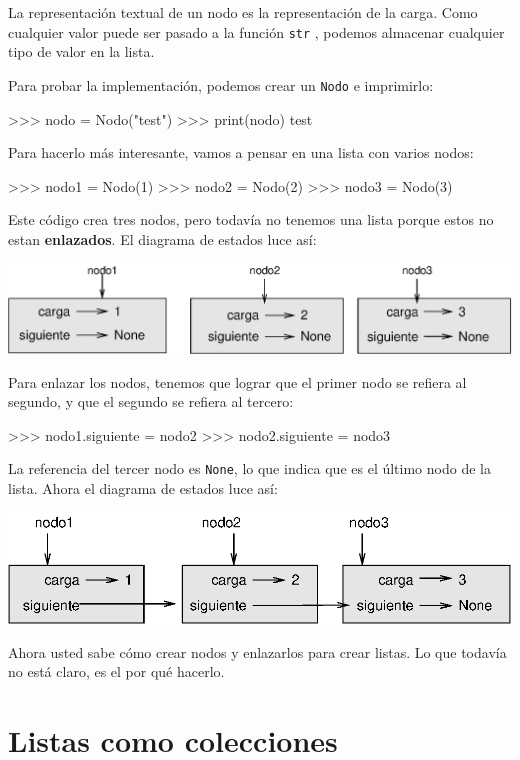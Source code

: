 La representación textual de un nodo es la representación de la carga.
Como cualquier valor puede ser pasado a la función \texttt{str} ,
podemos almacenar cualquier tipo de valor en la lista.

Para probar la implementación, podemos crear un \texttt{Nodo} e imprimirlo:

\beforeverb 
\begin{pyconcode}
>>> nodo = Nodo("test")
>>> print(nodo)
test
\end{pyconcode}
\afterverb Para hacerlo más interesante, vamos a pensar en una lista
con varios nodos:

\beforeverb 
\begin{pyconcode}
>>> nodo1 = Nodo(1)
>>> nodo2 = Nodo(2)
>>> nodo3 = Nodo(3)
\end{pyconcode}
\afterverb Este código crea tres nodos, pero todavía no tenemos una
lista porque estos no estan \textbf{enlazados}. El diagrama de estados
luce así:

\beforefig \centerline{\includegraphics[scale=0.7]{illustrations/link1}}
\afterfig

Para enlazar los nodos, tenemos que lograr que el primer nodo se refiera
al segundo, y que el segundo se refiera al tercero:

\beforeverb 
\begin{pyconcode}
>>> nodo1.siguiente = nodo2
>>> nodo2.siguiente = nodo3
\end{pyconcode}
\afterverb La referencia del tercer nodo es \texttt{None}, lo que
indica que es el último nodo de la lista. Ahora el diagrama de estados
luce así:

\beforefig \centerline{\includegraphics[scale=0.9]{illustrations/link2}}
\afterfig

Ahora usted sabe cómo crear nodos y enlazarlos para crear listas.
Lo que todavía no está claro, es el por qué hacerlo.

\section{Listas como colecciones}

